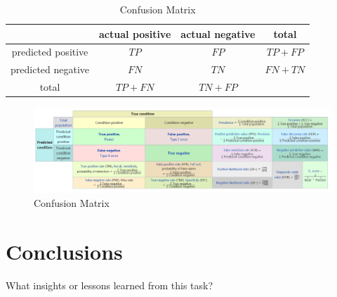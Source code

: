 \documentclass[12pt,a4paper,english]{amsart}
\begin{document}
\begin{table}
	\caption{Confusion Matrix}
	\centering
	\begin{tabular}{|c|c|c|c|}
		\hline
		& actual positive & actual negative & total \\
		\hline
		predicted positive & $TP$ & $FP$ & $TP+FP$ \\
		\hline
		predicted negative & $FN$ & $TN$ & $FN+TN$ \\
		\hline
		total	&	$TP+FN$ & $TN+FP$ & \\
		\hline
	\end{tabular}
\end{table}

\begin{figure}[htb]
	\centering
	\includegraphics[width=\textwidth]{img/auc.PNG}
	\caption{Confusion Matrix\cite{Wiki}}
\end{figure}
%
\section{Conclusions}

What insights or lessons learned from this task?
\cite{Ren2018a}



\end{document}
